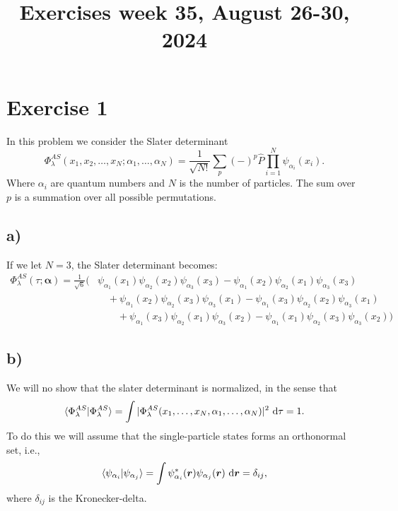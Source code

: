 \documentclass[a4paper, 11pt, notitlepage, english]{article}
\title{Exercises week 35, August 26-30, 2024}
\newcommand{\braket}[2]{\langle #1 | #2 \rangle}
\newcommand{\op}[1]{\hat{#1}}
\renewcommand{\d}{{\rm d}}
\newcommand{\bt}[1]{\boldsymbol{#1}}
\begin{document}
\maketitle

\section*{Exercise 1}

In this problem we consider the Slater determinant
$$\Phi_\lambda^{AS} (x_1, x_2, \ldots, x_N; \alpha_1, \ldots, \alpha_N) = \frac{1}{\sqrt{N!}}\sum_p (-)^p \op{P} \prod_{i=1}^N \psi_{\alpha_i}(x_i).$$
Where $\alpha_i$ are quantum numbers and $N$ is the number of particles. The sum over $p$ is a summation over all possible permutations.

\subsection*{a)}
If we let $N=3$, the Slater determinant becomes:
\begin{align*}   
\Phi_\lambda^{AS}(\tau;\bt{\alpha}) = \frac{1}{\sqrt{6}} \bigg(
&\psi_{\alpha_1}(x_1) \psi_{\alpha_2} (x_2)\psi_{\alpha_3}(x_3)
- \psi_{\alpha_1}(x_2) \psi_{\alpha_2} (x_1)\psi_{\alpha_3}(x_3) \\
&\quad+ \psi_{\alpha_1}(x_2) \psi_{\alpha_2} (x_3)\psi_{\alpha_3}(x_1)  
- \psi_{\alpha_1}(x_3) \psi_{\alpha_2} (x_2)\psi_{\alpha_3}(x_1) \\
&\qquad+ \psi_{\alpha_1}(x_3) \psi_{\alpha_2} (x_1)\psi_{\alpha_3}(x_2) 
- \psi_{\alpha_1}(x_1) \psi_{\alpha_2} (x_3)\psi_{\alpha_3}(x_2)\bigg)
\end{align*}

\subsection*{b)}
We will no show that the slater determinant is normalized, in the sense that
$$\braket{\Phi_\lambda^{AS}}{\Phi_\lambda^{AS}} = \int |\Phi_\lambda^{AS} (x_1,\ldots, x_N, \alpha_1, \ldots, \alpha_N)|^2 \ \d \tau= 1.$$
To do this we will assume that the single-particle states forms an orthonormal set, i.e.,
$$\braket{\psi_{\alpha_i}}{\psi_{\alpha_j}} = \int \psi^*_{\alpha_i}(\bt{r})\psi_{\alpha_j}(\bt{r}) \ \d \bt{r} = \delta_{ij},$$
where $\delta_{ij}$ is the Kronecker-delta.
\end{document}
